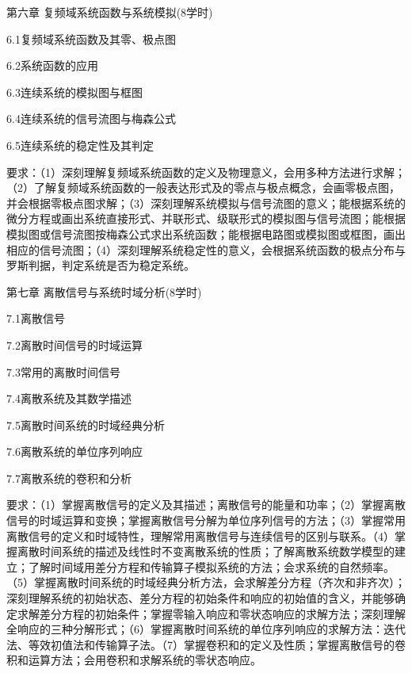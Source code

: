 \documentclass[letterpaper]{article}
\begin{document}
\vspace{1em}
第六章 \quad 复频域系统函数与系统模拟(8学时)\par
\quad\quad 6.1复频域系统函数及其零、极点图\par
\quad\quad 6.2系统函数的应用\par
\quad\quad 6.3连续系统的模拟图与框图\par
\quad\quad 6.4连续系统的信号流图与梅森公式\par
\quad\quad 6.5连续系统的稳定性及其判定\par
\quad\quad 要求：（1）深刻理解复频域系统函数的定义及物理意义，会用多种方法进行求解；（2）了解复频域系统函数的一般表达形式及的零点与极点概念，会画零极点图，并会根据零极点图求解；（3）深刻理解系统模拟与信号流图的意义；能根据系统的微分方程或画出系统直接形式、并联形式、级联形式的模拟图与信号流图；能根据模拟图或信号流图按梅森公式求出系统函数；能根据电路图或模拟图或框图，画出相应的信号流图；（4）深刻理解系统稳定性的意义，会根据系统函数的极点分布与罗斯判据，判定系统是否为稳定系统。\par
\vspace{1em}
第七章 \quad 离散信号与系统时域分析(8学时)\par
\quad\quad 7.1离散信号\par
\quad\quad 7.2离散时间信号的时域运算\par
\quad\quad 7.3常用的离散时间信号\par
\quad\quad 7.4离散系统及其数学描述\par
\quad\quad 7.5离散时间系统的时域经典分析\par
\quad\quad 7.6离散系统的单位序列响应\par
\quad\quad 7.7离散系统的卷积和分析\par
\quad\quad 要求：（1）掌握离散信号的定义及其描述；离散信号的能量和功率；（2）掌握离散信号的时域运算和变换；掌握离散信号分解为单位序列信号的方法；（3）掌握常用离散信号的定义和时域特性，理解常用离散信号与连续信号的区别与联系。（4）掌握离散时间系统的描述及线性时不变离散系统的性质；了解离散系统数学模型的建立；了解时间域用差分方程和传输算子模拟系统的方法；会求系统的自然频率。（5）掌握离散时间系统的时域经典分析方法，会求解差分方程（齐次和非齐次）；深刻理解系统的初始状态、差分方程的初始条件和响应的初始值的含义，并能够确定求解差分方程的初始条件；掌握零输入响应和零状态响应的求解方法；深刻理解全响应的三种分解形式；（6）掌握离散时间系统的单位序列响应的求解方法：迭代法、等效初值法和传输算子法。（7）掌握卷积和的定义及性质；掌握离散信号的卷积和运算方法；会用卷积和求解系统的零状态响应。\par
\vspace{1em}
\end{document}
